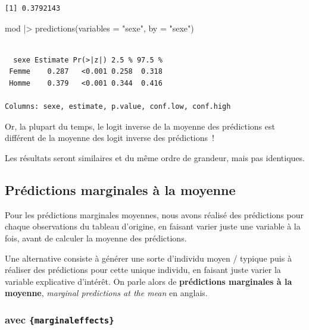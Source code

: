 \documentclass[
  letterpaper,
  DIV=11,
  numbers=noendperiod,
  oneside]{scrreprt}
\newenvironment{Shaded}{\begin{snugshade}}{\end{snugshade}}
\newcommand{\AttributeTok}[1]{\textcolor[rgb]{0.40,0.45,0.13}{#1}}
\newcommand{\FunctionTok}[1]{\textcolor[rgb]{0.28,0.35,0.67}{#1}}
\newcommand{\NormalTok}[1]{\textcolor[rgb]{0.00,0.23,0.31}{#1}}
\newcommand{\SpecialCharTok}[1]{\textcolor[rgb]{0.37,0.37,0.37}{#1}}
\newcommand{\StringTok}[1]{\textcolor[rgb]{0.13,0.47,0.30}{#1}}
\begin{document}
\begin{tcolorbox}
\begin{verbatim}
[1] 0.3792143
\end{verbatim}

\begin{Shaded}
\begin{Highlighting}[]
\NormalTok{mod }\SpecialCharTok{|\textgreater{}} 
  \FunctionTok{predictions}\NormalTok{(}\AttributeTok{variables =} \StringTok{"sexe"}\NormalTok{, }\AttributeTok{by =} \StringTok{"sexe"}\NormalTok{)}
\end{Highlighting}
\end{Shaded}

\begin{verbatim}

  sexe Estimate Pr(>|z|) 2.5 % 97.5 %
 Femme    0.287   <0.001 0.258  0.318
 Homme    0.379   <0.001 0.344  0.416

Columns: sexe, estimate, p.value, conf.low, conf.high 
\end{verbatim}

Or, la plupart du temps, le logit inverse de la moyenne des prédictions
est différent de la moyenne des logit inverse des prédictions~!

Les résultats seront similaires et du même ordre de grandeur, mais pas
identiques.

\end{tcolorbox}

\hypertarget{pruxe9dictions-marginales-uxe0-la-moyenne}{%
\subsection{Prédictions marginales à la
moyenne}\label{pruxe9dictions-marginales-uxe0-la-moyenne}}

Pour les prédictions marginales moyennes, nous avons réalisé des
prédictions pour chaque observations du tableau d'origine, en faisant
varier juste une variable à la fois, avant de calculer la moyenne des
prédictions.

Une alternative consiste à générer une sorte d'individu moyen / typique
puis à réaliser des prédictions pour cette unique individu, en faisant
juste varier la variable explicative d'intérêt. On parle alors de
\textbf{prédictions marginales à la moyenne}, \emph{marginal predictions
at the mean} en anglais.

\hypertarget{avec-marginaleffects}{%
\subsubsection{\texorpdfstring{avec
\texttt{\{marginaleffects\}}}{avec \{marginaleffects\}}}\label{avec-marginaleffects}}
\end{document}
